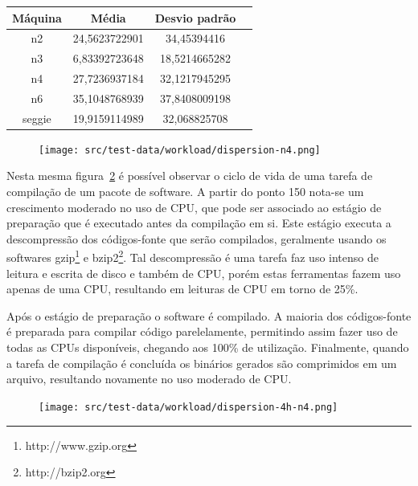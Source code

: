 \begin{table}[htp]
\centering
\hspace{-2cm} %
\label{quadro:desviopadrao}
\begin{tabular}{| c | c | c | c |}
\hline
Máquina & Média & Desvio padrão \\
\hline
n2 	& 	24,5623722901 & 34,45394416 \\
n3 	& 	6,83392723648 & 18,5214665282 \\
n4 	& 	27,7236937184 & 32,1217945295 \\
n6 	& 	35,1048768939 & 37,8408009198 \\
seggie 	&	19,9159114989 & 32,068825708 \\
\hline
\end{tabular}
\end{table}

\begin{figure}
\centering
\texttt{[image: src/test-data/workload/dispersion-n4.png]}
\label{fig:predispn4}
\end{figure}

Nesta mesma figura~\ref{fig:disp4hn4} é possível observar o ciclo de vida
de uma tarefa de compilação de um pacote de software. A partir do ponto 150
nota-se um crescimento moderado no uso de CPU, que pode ser associado ao
estágio de preparação que é executado antes da compilação em si. Este
estágio executa a descompressão dos códigos-fonte que serão compilados,
geralmente usando os softwares gzip\footnote{http://www.gzip.org} e
bzip2\footnote{http://bzip2.org}. Tal descompressão é uma tarefa faz uso
intenso de leitura e escrita de disco e também de CPU, porém estas
ferramentas fazem uso apenas de uma CPU, resultando em leituras de CPU em
torno de 25\%.

Após o estágio de preparação o software é compilado. A maioria dos
códigos-fonte é preparada para compilar código parelelamente, permitindo
assim fazer uso de todas as CPUs disponíveis, chegando aos 100\% de
utilização. Finalmente, quando a tarefa de compilação é concluída os
binários gerados são comprimidos em um arquivo, resultando novamente no uso
moderado de CPU.

\begin{figure}[htp]
\centering
\texttt{[image: src/test-data/workload/dispersion-4h-n4.png]}
\label{fig:disp4hn4}
\end{figure}

